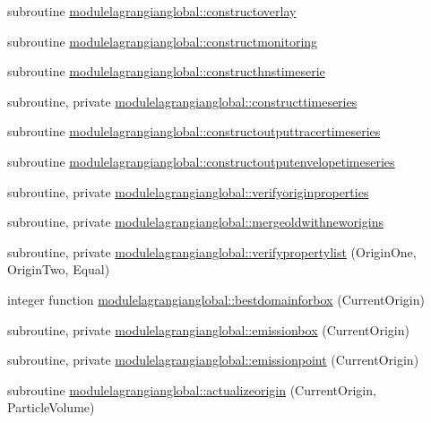 \begin{DoxyCompactItemize}
\item 
subroutine \mbox{\hyperlink{namespacemodulelagrangianglobal_a66523dedf972d121569f3902f6d4a148}{modulelagrangianglobal\+::constructoverlay}}
\item 
subroutine \mbox{\hyperlink{namespacemodulelagrangianglobal_ae93400b6f236b2e44a7b90febb2be220}{modulelagrangianglobal\+::constructmonitoring}}
\item 
subroutine \mbox{\hyperlink{namespacemodulelagrangianglobal_a56d6b284b701a9103a92e0956ad4cc6a}{modulelagrangianglobal\+::constructhnstimeserie}}
\item 
subroutine, private \mbox{\hyperlink{namespacemodulelagrangianglobal_ace8bf8bfcb4ec7384b2bb7af77034f8e}{modulelagrangianglobal\+::constructtimeseries}}
\item 
subroutine \mbox{\hyperlink{namespacemodulelagrangianglobal_a43f3d0f411e8d9b0df16d63f033382ff}{modulelagrangianglobal\+::constructoutputtracertimeseries}}
\item 
subroutine \mbox{\hyperlink{namespacemodulelagrangianglobal_ac9b3291ed411a75cceb9948f7f671764}{modulelagrangianglobal\+::constructoutputenvelopetimeseries}}
\item 
subroutine, private \mbox{\hyperlink{namespacemodulelagrangianglobal_a665e00ca13f06e06edf9476f18ec2b58}{modulelagrangianglobal\+::verifyoriginproperties}}
\item 
subroutine, private \mbox{\hyperlink{namespacemodulelagrangianglobal_a615ab3a1eadb5c6d09f9fe8642d2c59f}{modulelagrangianglobal\+::mergeoldwithneworigins}}
\item 
subroutine, private \mbox{\hyperlink{namespacemodulelagrangianglobal_a2f8a821bfd65da179345d2d6813fb1e3}{modulelagrangianglobal\+::verifypropertylist}} (Origin\+One, Origin\+Two, Equal)
\item 
integer function \mbox{\hyperlink{namespacemodulelagrangianglobal_a88f19e8e5a4b9ce0cfe45715a5e96dbc}{modulelagrangianglobal\+::bestdomainforbox}} (Current\+Origin)
\item 
subroutine, private \mbox{\hyperlink{namespacemodulelagrangianglobal_ad983b6fdc70e80cc81cd4c13a69b7f1f}{modulelagrangianglobal\+::emissionbox}} (Current\+Origin)
\item 
subroutine, private \mbox{\hyperlink{namespacemodulelagrangianglobal_a9d524fab1163e87ac878a520ae670bf9}{modulelagrangianglobal\+::emissionpoint}} (Current\+Origin)
\item 
subroutine \mbox{\hyperlink{namespacemodulelagrangianglobal_a2922324362ebb3dd949bc869b16e90b9}{modulelagrangianglobal\+::actualizeorigin}} (Current\+Origin, Particle\+Volume)

\end{DoxyCompactItemize}
